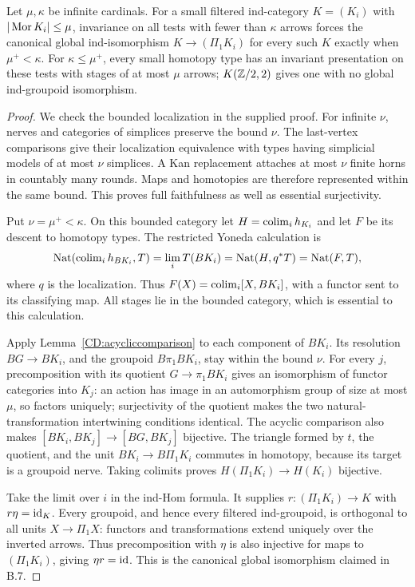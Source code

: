 \begin{proposition}
\label{CD:boundedtests}
Let $\mu,\kappa$ be infinite cardinals.  For a small filtered
ind-category $K=(K_i)$ with $|\operatorname{Mor} K_i|\le\mu$, invariance on all
tests with fewer than $\kappa$ arrows forces the canonical global
ind-isomorphism $K\to(\Pi_1K_i)$ for every such $K$ exactly when
$\mu^+<\kappa$.
For $\kappa\le\mu^+$, every small homotopy type has an invariant
presentation on these tests with stages of at most $\mu$ arrows;
$K(\mathbb Z/2,2)$ gives one with no global ind-groupoid isomorphism.
\end{proposition}
\begin{proof}
We check the bounded localization in the supplied proof.  For infinite
$\nu$, nerves and categories of simplices preserve the bound $\nu$.
The last-vertex comparisons give their localization equivalence with
types having simplicial models of at most $\nu$ simplices.  A Kan
replacement attaches at most $\nu$ finite horns in countably many
rounds.  Maps and homotopies are therefore represented within the same
bound.  This proves full faithfulness as well as essential surjectivity.

Put $\nu=\mu^+<\kappa$.  On this bounded category let
$H=\operatorname{colim}_i h_{K_i}$ and let $F$ be its descent to homotopy types.
The restricted Yoneda calculation is
\[
 \operatorname{Nat}(\operatorname{colim}_i h_{BK_i},T)
 =\lim_iT(BK_i)
 =\operatorname{Nat}(H,q^*T)
 =\operatorname{Nat}(F,T),
\]
where $q$ is the localization.  Thus
$F(X)=\operatorname{colim}_i[X,BK_i]$, with a functor sent to its classifying map.
All stages lie in the bounded category, which is essential to this
calculation.

Apply Lemma~\ref{CD:acycliccomparison} to each component of $BK_i$.
Its resolution $BG\to BK_i$, and the groupoid $B\pi_1BK_i$, stay
within the bound $\nu$.  For every $j$, precomposition with its
quotient $G\to\pi_1BK_i$ gives an isomorphism of functor categories
into $K_j$: an action has image in an automorphism group of size at
most $\mu$, so factors uniquely; surjectivity of the quotient makes
the two natural-transformation intertwining conditions identical.
The acyclic comparison also makes $[BK_i,BK_j]\to[BG,BK_j]$
bijective.  The triangle formed by $t$, the quotient, and the unit
$BK_i\to B\Pi_1K_i$ commutes in homotopy, because its target is a
groupoid nerve.  Taking colimits proves
$H(\Pi_1K_i)\to H(K_i)$ bijective.

Take the limit over $i$ in the ind-Hom formula.  It supplies
$r:(\Pi_1K_i)\to K$ with $r\eta=\mathrm{id}_K$.  Every groupoid, and hence
every filtered ind-groupoid, is orthogonal to all units
$X\to\Pi_1X$: functors and transformations extend uniquely over
the inverted arrows.  Thus precomposition with $\eta$ is also
injective for maps to $(\Pi_1K_i)$, giving $\eta r=\mathrm{id}$.
This is the canonical global isomorphism claimed in B.7.


\end{proof}
